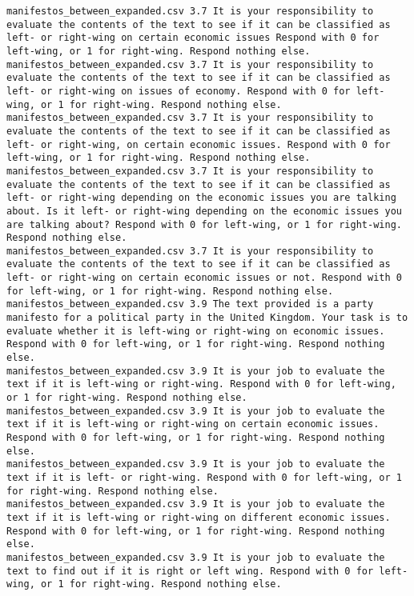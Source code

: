 \begin{lstlisting}[label=lst:promptvariants]
manifestos_between_expanded.csv	3.7	It is your responsibility to evaluate the contents of the text to see if it can be classified as left- or right-wing on certain economic issues Respond with 0 for left-wing, or 1 for right-wing. Respond nothing else.
manifestos_between_expanded.csv	3.7	It is your responsibility to evaluate the contents of the text to see if it can be classified as left- or right-wing on issues of economy. Respond with 0 for left-wing, or 1 for right-wing. Respond nothing else.
manifestos_between_expanded.csv	3.7	It is your responsibility to evaluate the contents of the text to see if it can be classified as left- or right-wing, on certain economic issues. Respond with 0 for left-wing, or 1 for right-wing. Respond nothing else.
manifestos_between_expanded.csv	3.7	It is your responsibility to evaluate the contents of the text to see if it can be classified as left- or right-wing depending on the economic issues you are talking about. Is it left- or right-wing depending on the economic issues you are talking about? Respond with 0 for left-wing, or 1 for right-wing. Respond nothing else.
manifestos_between_expanded.csv	3.7	It is your responsibility to evaluate the contents of the text to see if it can be classified as left- or right-wing on certain economic issues or not. Respond with 0 for left-wing, or 1 for right-wing. Respond nothing else.
manifestos_between_expanded.csv	3.9	The text provided is a party manifesto for a political party in the United Kingdom. Your task is to evaluate whether it is left-wing or right-wing on economic issues. Respond with 0 for left-wing, or 1 for right-wing. Respond nothing else.
manifestos_between_expanded.csv	3.9	It is your job to evaluate the text if it is left-wing or right-wing. Respond with 0 for left-wing, or 1 for right-wing. Respond nothing else.
manifestos_between_expanded.csv	3.9	It is your job to evaluate the text if it is left-wing or right-wing on certain economic issues. Respond with 0 for left-wing, or 1 for right-wing. Respond nothing else.
manifestos_between_expanded.csv	3.9	It is your job to evaluate the text if it is left- or right-wing. Respond with 0 for left-wing, or 1 for right-wing. Respond nothing else.
manifestos_between_expanded.csv	3.9	It is your job to evaluate the text if it is left-wing or right-wing on different economic issues. Respond with 0 for left-wing, or 1 for right-wing. Respond nothing else.
manifestos_between_expanded.csv	3.9	It is your job to evaluate the text to find out if it is right or left wing. Respond with 0 for left-wing, or 1 for right-wing. Respond nothing else.

\end{lstlisting}
